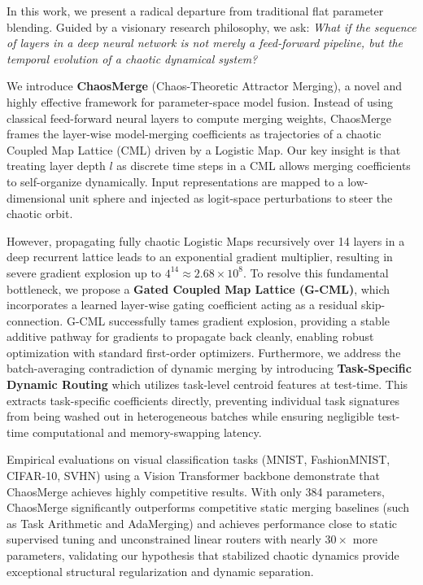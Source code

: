 In this work, we present a radical departure from traditional flat parameter blending. Guided by a visionary research philosophy, we ask: \emph{What if the sequence of layers in a deep neural network is not merely a feed-forward pipeline, but the temporal evolution of a chaotic dynamical system?} 

We introduce \textbf{ChaosMerge} (Chaos-Theoretic Attractor Merging), a novel and highly effective framework for parameter-space model fusion. Instead of using classical feed-forward neural layers to compute merging weights, ChaosMerge frames the layer-wise model-merging coefficients as trajectories of a chaotic Coupled Map Lattice (CML) driven by a Logistic Map. Our key insight is that treating layer depth $l$ as discrete time steps in a CML allows merging coefficients to self-organize dynamically. Input representations are mapped to a low-dimensional unit sphere and injected as logit-space perturbations to steer the chaotic orbit. 

However, propagating fully chaotic Logistic Maps recursively over 14 layers in a deep recurrent lattice leads to an exponential gradient multiplier, resulting in severe gradient explosion up to $4^{14} \approx 2.68 \times 10^8$. To resolve this fundamental bottleneck, we propose a \textbf{Gated Coupled Map Lattice (G-CML)}, which incorporates a learned layer-wise gating coefficient acting as a residual skip-connection. G-CML successfully tames gradient explosion, providing a stable additive pathway for gradients to propagate back cleanly, enabling robust optimization with standard first-order optimizers. Furthermore, we address the batch-averaging contradiction of dynamic merging by introducing \textbf{Task-Specific Dynamic Routing} which utilizes task-level centroid features at test-time. This extracts task-specific coefficients directly, preventing individual task signatures from being washed out in heterogeneous batches while ensuring negligible test-time computational and memory-swapping latency.

Empirical evaluations on visual classification tasks (MNIST, FashionMNIST, CIFAR-10, SVHN) using a Vision Transformer backbone demonstrate that ChaosMerge achieves highly competitive results. With only 384 parameters, ChaosMerge significantly outperforms competitive static merging baselines (such as Task Arithmetic and AdaMerging) and achieves performance close to static supervised tuning and unconstrained linear routers with nearly $30\times$ more parameters, validating our hypothesis that stabilized chaotic dynamics provide exceptional structural regularization and dynamic separation.

